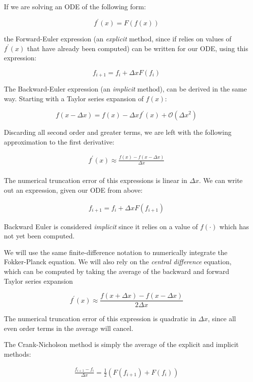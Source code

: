 \documentclass[12pt]{article}
\newcommand{\be}{\begin{equation}}
\newcommand{\ee}{\end{equation}}
\begin{document}
If we are solving an ODE of the following form:

\be
	f^\prime(x) = F(f(x))
\ee

the Forward-Euler expression (an \emph{explicit} method, since if relies on values of $f^\prime(x)$ that have already been computed) can be written for our ODE, using this expression:

\be
	f_{i+1} = f_{i} + \Delta x F(f_i)
\ee

The Backward-Euler expression (an \emph{implicit} method), can be derived in the same way. Starting with a Taylor series expansion of $f(x)$:

\be
	f(x - \Delta x) = f(x) - \Delta x f^{\prime}(x) + \mathcal{O}({\Delta x}^2)
\ee

Discarding all second order and greater terms, we are left with the following approximation to the first derivative:

\begin{align}
	f^{\prime}(x) \approx \frac{f(x) - f(x-\Delta x)}{\Delta x} \\
\end{align}

The numerical truncation error of this expressions is linear in $\Delta x$. We can write out an expression, given our ODE from above:

\begin{align}
	f_{i+1} = f_{i} + \Delta x F(f_{i+1})
\end{align}

Backward Euler is considered \emph{implicit} since it relies on a value of $f(\cdot)$ which has not yet been computed.

We will use the same finite-difference notation to numerically integrate the Fokker-Planck equation. We will also rely on the \emph{central difference} equation, which can be computed by taking the average of the backward and forward Taylor series expansion

\be
	f^{\prime}(x) \approx \frac{f(x +\Delta x) - f(x - \Delta x)}{2 \Delta x}
\ee

The numerical truncation error of this expression is quadratic in $\Delta x$, since all even order terms in the average will cancel. 

The Crank-Nicholson method is simply the average of the explicit and implicit methods:

\begin{align}
	\frac{f_{i+1} - f_{i}}{\Delta x}= \frac{1}{2} (F(f_{i+1}) + F(f_{i}))
\end{align}
\end{document}
